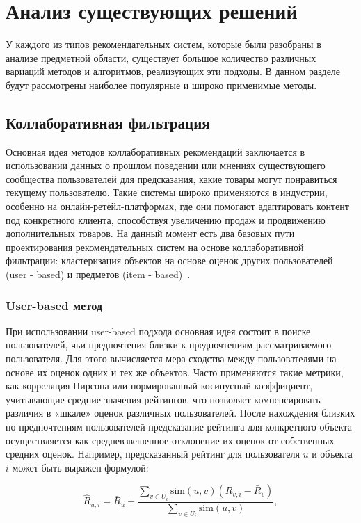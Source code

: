 \chapter{Анализ существующих решений}

У каждого из типов рекомендательных систем, которые были разобраны в анализе предметной области, 
существует большое количество различных вариаций методов и алгоритмов, реализующих эти подходы.
В данном разделе будут рассмотрены наиболее популярные и широко применимые методы. 

\section{Коллаборативная фильтрация}

Основная идея методов коллаборативных рекомендаций заключается в использовании данных о прошлом поведении или
мнениях существующего сообщества пользователей для предсказания, какие товары могут понравиться текущему пользователю.
Такие системы широко применяются в индустрии, особенно на онлайн-ретейл-платформах, где они помогают адаптировать
контент под конкретного клиента, способствуя увеличению продаж и продвижению дополнительных товаров.
На данный момент есть два базовых пути проектирования рекомендательных систем на основе коллаборативной фильтрации:
кластеризация объектов на основе оценок других пользователей (user - based) и предметов
(item - based)~\cite{rek_intro}.

\subsection*{User-based метод}
При использовании user-based подхода основная идея состоит в поиске пользователей, чьи предпочтения близки к предпочтениям рассматриваемого пользователя.
Для этого вычисляется мера сходства между пользователями на основе их оценок одних и тех же объектов.
Часто применяются такие метрики, как корреляция Пирсона или нормированный косинусный коэффициент,
учитывающие средние значения рейтингов, что позволяет компенсировать различия в «шкале» оценок различных пользователей.
После нахождения близких по предпочтениям пользователей предсказание рейтинга для конкретного объекта осуществляется как
средневзвешенное отклонение их оценок от собственных средних оценок.
Например, предсказанный рейтинг для пользователя \(u\) и объекта \(i\) может быть выражен формулой:

\begin{equation}
	\hat{R}_{u,i} = \bar{R}_u + \frac{\sum_{v \in U_i} \text{sim}(u,v)(R_{v,i}-\bar{R}_v)}{\sum_{v \in U_i} \text{sim}(u,v)},
\end{equation}

